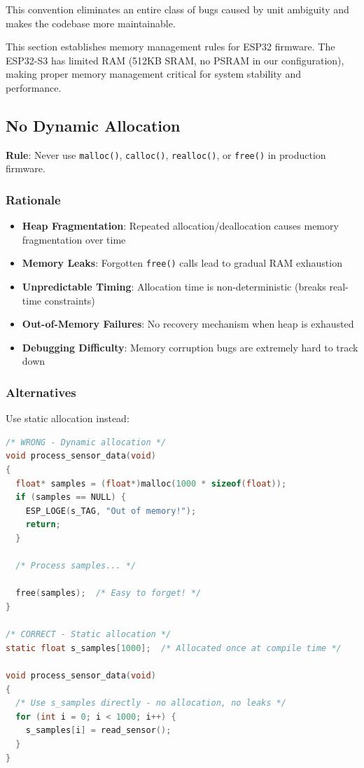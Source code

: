 This convention eliminates an entire class of bugs caused by unit ambiguity and makes the codebase more maintainable.


This section establishes memory management rules for ESP32 firmware. The ESP32-S3 has limited RAM (512KB SRAM, no PSRAM in our configuration), making proper memory management critical for system stability and performance.

\subsection{No Dynamic Allocation}

\textbf{Rule}: Never use \texttt{malloc()}, \texttt{calloc()}, \texttt{realloc()}, or \texttt{free()} in production firmware.

\subsubsection{Rationale}

\begin{itemize}
  \item \textbf{Heap Fragmentation}: Repeated allocation/deallocation causes memory fragmentation over time
  \item \textbf{Memory Leaks}: Forgotten \texttt{free()} calls lead to gradual RAM exhaustion
  \item \textbf{Unpredictable Timing}: Allocation time is non-deterministic (breaks real-time constraints)
  \item \textbf{Out-of-Memory Failures}: No recovery mechanism when heap is exhausted
  \item \textbf{Debugging Difficulty}: Memory corruption bugs are extremely hard to track down
\end{itemize}

\subsubsection{Alternatives}

Use static allocation instead:

\begin{lstlisting}[language=C]
/* WRONG - Dynamic allocation */
void process_sensor_data(void)
{
  float* samples = (float*)malloc(1000 * sizeof(float));
  if (samples == NULL) {
    ESP_LOGE(s_TAG, "Out of memory!");
    return;
  }
  
  /* Process samples... */
  
  free(samples);  /* Easy to forget! */
}

/* CORRECT - Static allocation */
static float s_samples[1000];  /* Allocated once at compile time */

void process_sensor_data(void)
{
  /* Use s_samples directly - no allocation, no leaks */
  for (int i = 0; i < 1000; i++) {
    s_samples[i] = read_sensor();
  }
}


\end{lstlisting}
